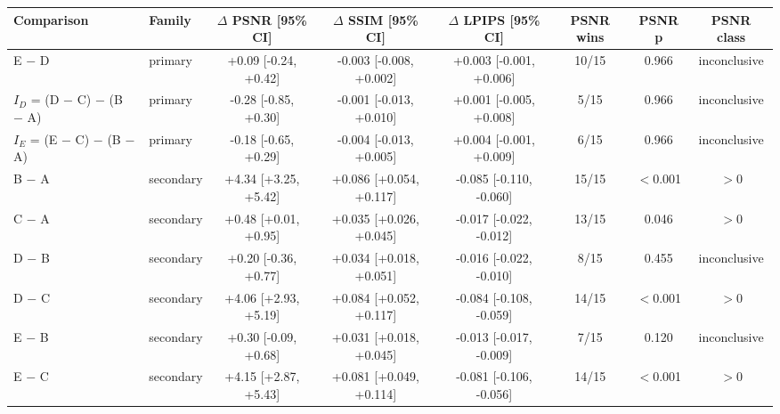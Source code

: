\begin{tabular}{llcccccc}
\toprule
Comparison & Family & $\Delta$ PSNR [95\% CI] & $\Delta$ SSIM [95\% CI] & $\Delta$ LPIPS [95\% CI] & PSNR wins & PSNR p & PSNR class \\
\midrule
E $-$ D & primary & +0.09 [-0.24, +0.42] & -0.003 [-0.008, +0.002] & +0.003 [-0.001, +0.006] & 10/15 & 0.966 & inconclusive \\
$I_D$ = (D $-$ C) $-$ (B $-$ A) & primary & -0.28 [-0.85, +0.30] & -0.001 [-0.013, +0.010] & +0.001 [-0.005, +0.008] & 5/15 & 0.966 & inconclusive \\
$I_E$ = (E $-$ C) $-$ (B $-$ A) & primary & -0.18 [-0.65, +0.29] & -0.004 [-0.013, +0.005] & +0.004 [-0.001, +0.009] & 6/15 & 0.966 & inconclusive \\
B $-$ A & secondary & +4.34 [+3.25, +5.42] & +0.086 [+0.054, +0.117] & -0.085 [-0.110, -0.060] & 15/15 & $<$0.001 & $>$0 \\
C $-$ A & secondary & +0.48 [+0.01, +0.95] & +0.035 [+0.026, +0.045] & -0.017 [-0.022, -0.012] & 13/15 & 0.046 & $>$0 \\
D $-$ B & secondary & +0.20 [-0.36, +0.77] & +0.034 [+0.018, +0.051] & -0.016 [-0.022, -0.010] & 8/15 & 0.455 & inconclusive \\
D $-$ C & secondary & +4.06 [+2.93, +5.19] & +0.084 [+0.052, +0.117] & -0.084 [-0.108, -0.059] & 14/15 & $<$0.001 & $>$0 \\
E $-$ B & secondary & +0.30 [-0.09, +0.68] & +0.031 [+0.018, +0.045] & -0.013 [-0.017, -0.009] & 7/15 & 0.120 & inconclusive \\
E $-$ C & secondary & +4.15 [+2.87, +5.43] & +0.081 [+0.049, +0.114] & -0.081 [-0.106, -0.056] & 14/15 & $<$0.001 & $>$0 \\
\bottomrule
\end{tabular}

